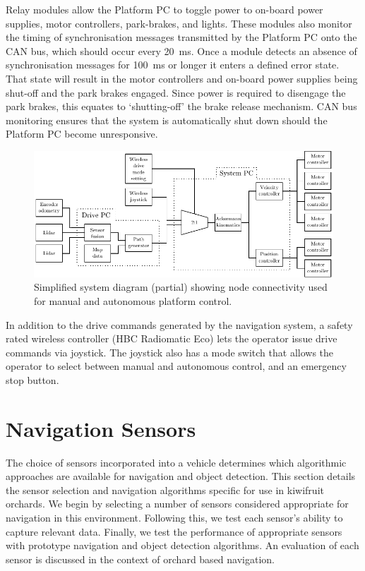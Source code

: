 \documentclass[preprint,authoryear,12pt]{elsarticle}
\begin{document}
        Relay modules allow the Platform PC to toggle power to on-board power supplies, motor controllers, park-brakes, and lights.
        These modules also monitor the timing of synchronisation messages transmitted by the Platform PC onto the CAN bus, which should occur every \SI{20}{\milli\second}.
        Once a module detects an absence of synchronisation messages for \SI{100}{\milli\second} or longer it enters a defined error state.
        That state will result in the motor controllers and on-board power supplies being shut-off and the park brakes engaged.
        Since power is required to disengage the park brakes, this equates to `shutting-off' the brake release mechanism.
        CAN bus monitoring ensures that the system is automatically shut down should the Platform PC become unresponsive.

        \begin{figure}[htb]
            \centering
            \includegraphics[width=\linewidth]{imgs/system_diagram/software.pdf}
            \caption{Simplified system diagram (partial) showing node connectivity used for manual and autonomous platform control.}
            \label{fig:system_diagram_software}
        \end{figure}

        In addition to the drive commands generated by the navigation system, a safety rated wireless controller (HBC Radiomatic Eco) lets the operator issue drive commands via joystick.
        The joystick also has a mode switch that allows the operator to select between manual and autonomous control, and an emergency stop button.


\section{Navigation Sensors}
\label{sect:sensors}
    The choice of sensors incorporated into a vehicle determines which algorithmic approaches are available for navigation and object detection.
    This section details the sensor selection and navigation algorithms specific for use in kiwifruit orchards.
    We begin by selecting a number of sensors considered appropriate for navigation in this environment.
    Following this, we test each sensor's ability to capture relevant data.
    Finally, we test the performance of appropriate sensors with prototype navigation and object detection algorithms.
    An evaluation of each sensor is discussed in the context of orchard based navigation.
\end{document}
